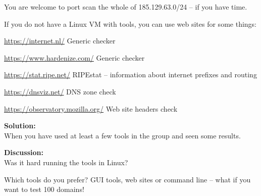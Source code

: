 \documentclass[a4paper,11pt,notitlepage,landscape]{report}
\begin{document}
You are welcome to port scan the whole of 185.129.63.0/24 -- if you have time.

If you do not have a Linux VM with tools, you can use web sites for some things:

\begin{list2}
\item \url{https://internet.nl/} Generic checker
\item \url{https://www.hardenize.com/} Generic checker
\item \url{https://stat.ripe.net/} RIPEstat -- information about internet prefixes and routing
\item \url{https://dnsviz.net/} DNS zone check
\item \url{https://observatory.mozilla.org/} Web site headers check
\end{list2}

{\bf Solution:}\\
When you have used at least a few tools in the group and seen some results.

{\bf Discussion:}\\
Was it hard running the tools in Linux?

Which tools do you prefer? GUI tools, web sites or command line -- what if you want to test 100 domains!
\end{document}
